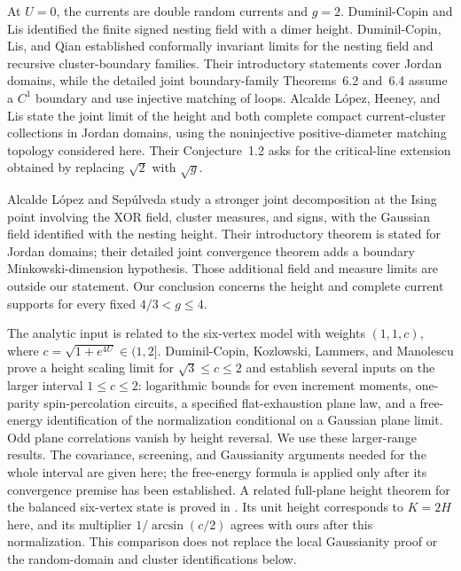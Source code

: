 At $U=0$, the currents are double random currents and $g=2$.
Duminil-Copin and Lis \cite[Theorems~1.1--1.2]{DuminilCopinLis2019}
identified the finite signed nesting field with a dimer height.
Duminil-Copin, Lis, and Qian \cite{DRC2025} established conformally
invariant limits for the nesting field and recursive cluster-boundary
families. Their introductory statements cover Jordan domains, while the
detailed joint boundary-family Theorems~6.2 and~6.4 assume a $C^1$
boundary and use injective matching of loops. Alcalde L\'opez, Heeney,
and Lis \cite[Theorem~1.14 and Appendix~B]{AlcaldeLopezHeeneyLis2026}
state the joint limit of the height and both complete compact
current-cluster collections in Jordan domains, using the noninjective
positive-diameter matching topology considered here. Their
Conjecture~1.2 asks for the critical-line extension obtained by replacing
$\sqrt2$ with $\sqrt g$.

Alcalde L\'opez and Sep\'ulveda
\cite[Theorems~1.4 and~9.5, and Lemma~9.1]{AlcaldeLopezSepulveda2026} study a stronger
joint decomposition at the Ising point involving the XOR field, cluster
measures, and signs, with the Gaussian field identified with the nesting
height. Their introductory theorem is stated for Jordan domains; their
detailed joint convergence theorem adds a boundary Minkowski-dimension
hypothesis. Those additional field and measure limits are
outside our statement. Our conclusion concerns the height and complete
current supports for every fixed $4/3<g\le4$.

The analytic input is related to the six-vertex model with weights
$(1,1,c)$, where $c=\sqrt{1+e^{4U}}\in(1,2]$.
Duminil-Copin, Kozlowski, Lammers, and Manolescu \cite{DKLM2026}
prove a height scaling limit for $\sqrt3\le c\le2$ and establish several
inputs on the larger interval $1\le c\le2$: logarithmic bounds for even
increment moments, one-parity spin-percolation circuits, a specified
flat-exhaustion plane law, and a free-energy identification of the
normalization conditional on a Gaussian plane limit. Odd plane correlations
vanish by height reversal. We use these larger-range results. The covariance, screening,
and Gaussianity arguments needed for the whole interval are given here;
the free-energy formula is applied only after its convergence premise
has been established. A related full-plane height theorem for the balanced
six-vertex state is proved in \cite[Theorem~1.1]{BalancedSixVertex2026}. Its unit
height corresponds to $K=2H$ here, and its multiplier
$1/\arcsin(c/2)$ agrees with ours after this normalization. This
comparison does not replace the local Gaussianity proof or the
random-domain and cluster identifications below.

